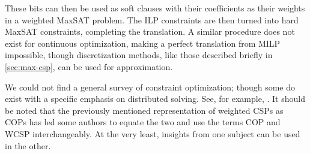 These bits can then be used as soft clauses with their coefficients as their weights in a weighted MaxSAT problem. The ILP constraints are then turned into hard MaxSAT constraints, completing the translation. A similar procedure does not exist for continuous optimization, making a perfect translation from MILP impossible, though discretization methods, like those described briefly in \ref{sec:max-csp}, can be used for approximation.

We could not find a general survey of constraint optimization; though some do exist with a specific emphasis on distributed solving. See, for example, \citep{fioretto2018distributed}. It should be noted that the previously mentioned representation of weighted CSPs as COPs has led some authors to equate the two and use the terms COP and WCSP interchangeably. At the very least, insights from one subject can be used in the other.



